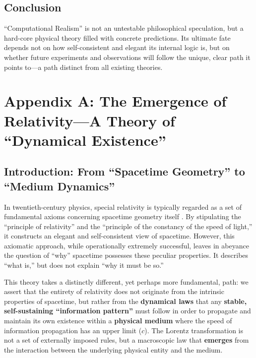 \documentclass[11pt, a4paper]{article}
\begin{document}
\subsection*{Conclusion}
``Computational Realism'' is not an untestable philosophical speculation, but a hard-core physical theory filled with concrete predictions. Its ultimate fate depends not on how self-consistent and elegant its internal logic is, but on whether future experiments and observations will follow the unique, clear path it points to—a path distinct from all existing theories.







\appendix
\section{Appendix A: The Emergence of Relativity—A Theory of ``Dynamical Existence''}

\subsection{Introduction: From ``Spacetime Geometry'' to ``Medium Dynamics''}

In twentieth-century physics, special relativity is typically regarded as a set of fundamental axioms concerning spacetime geometry itself \cite{Einstein1905}. By stipulating the ``principle of relativity'' and the ``principle of the constancy of the speed of light,'' it constructs an elegant and self-consistent view of spacetime. However, this axiomatic approach, while operationally extremely successful, leaves in abeyance the question of ``why'' spacetime possesses these peculiar properties. It describes ``what is,'' but does not explain ``why it must be so.''

This theory takes a distinctly different, yet perhaps more fundamental, path: we assert that the entirety of relativity does not originate from the intrinsic properties of spacetime, but rather from the \textbf{dynamical laws} that any \textbf{stable, self-sustaining ``information pattern''} must follow in order to propagate and maintain its own existence within a \textbf{physical medium} where the speed of information propagation has an upper limit ($c$). The Lorentz transformation is not a set of externally imposed rules, but a macroscopic law that \textbf{emerges} from the interaction between the underlying physical entity and the medium.
\end{document}
